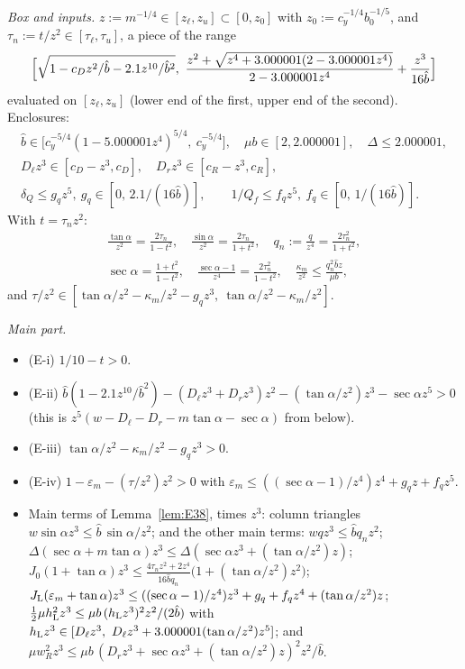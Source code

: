\documentclass[11pt]{amsart}
\newcommand{\sa}{\sin\alpha}
\newcommand{\ta}{\tan\alpha}
\newcommand{\se}{\sec\alpha}
\theoremstyle{definition}
\theoremstyle{remark}
\numberwithin{equation}{section}
\begin{document}
\emph{Box and inputs.} $z:=m^{-1/4}\in[z_\ell,z_u]\subset[0,z_0]$ with $z_0:=c_y^{-1/4}b_0^{-1/5}$, and
$\tau_n:=t/z^2\in[\tau_\ell,\tau_u]$, a piece of the range
\[
\Bigl[\sqrt{1-c_Dz^2/\hat b-2.1z^{10}/\hat b^2},\ \frac{z^2+\sqrt{z^4+3.000001(2-3.000001z^4)}}{2-3.000001z^4}+\frac{z^3}{16\hat b}\Bigr]
\]
evaluated on $[z_\ell,z_u]$ (lower end of the first, upper end of the second). Enclosures:
\begin{gather*}
\hat b\in\bigl[c_y^{-5/4}(1-5.000001z^4)^{5/4},\ c_y^{-5/4}\bigr],\quad \mu b\in[2,2.000001],\quad \Delta\le2.000001,\\
D_\ell z^3\in[c_D-z^3,c_D],\quad D_rz^3\in[c_R-z^3,c_R],\\
\delta_Q\le g_qz^5,\ g_q\in[0,\,2.1/(16\hat b)],\qquad
1/Q_f\le f_qz^5,\ f_q\in[0,\,1/(16\hat b)].
\end{gather*}
With $t=\tau_nz^2$:
\begin{gather*}
\frac{\ta}{z^2}=\frac{2\tau_n}{1-t^2},\quad \frac{\sa}{z^2}=\frac{2\tau_n}{1+t^2},\quad q_n:=\frac q{z^4}=\frac{2\tau_n^2}{1+t^2},\\
\se=\frac{1+t^2}{1-t^2},\quad \frac{\se-1}{z^4}=\frac{2\tau_n^2}{1-t^2},\quad
\frac{\kappa_m}{z^2}\le\frac{q_n^2\hat bz}{\mu b},
\end{gather*}
and $\tau/z^2\in[\ta/z^2-\kappa_m/z^2-g_qz^3,\ \ta/z^2-\kappa_m/z^2]$.

\emph{Main part.}
\begin{itemize}
\item (E-i) $1/10-t>0$.
\item (E-ii) $\hat b(1-2.1z^{10}/\hat b^2)-(D_\ell z^3+D_rz^3)z^2-(\ta/z^2)z^3-\se z^5>0$ (this is
$z^5(w-D_\ell-D_r-m\ta-\se)$ from below).
\item (E-iii) $\ta/z^2-\kappa_m/z^2-g_qz^3>0$.
\item (E-iv) $1-\varepsilon_m-(\tau/z^2)z^2>0$ with $\varepsilon_m\le((\se-1)/z^4)z^4+g_qz+f_qz^5$.
\item Main terms of Lemma~\ref{lem:E38}, times $z^3$: column triangles $w\sa z^3\le\hat b\,\sa/z^2$; and the other main
terms: $wqz^3\le\hat bq_nz^2$; $\Delta(\se+m\ta)z^3\le\Delta(\se z^3+(\ta/z^2)z)$;
$J_0(1+\ta)z^3\le\frac{4\tau_nz^2+2z^4}{16\hat bq_n}\bigl(1+(\ta/z^2)z^2\bigr)$;
$J_{\rm L}(\varepsilon_m+\ta)z^3\le((\se-1)/z^4)z^3+g_q+f_qz^4+(\ta/z^2)z$;
$\frac12\mu h_{\rm L}^2z^3\le\mu b\,(h_{\rm L}z^3)^2z^2/(2\hat b)$ with
$h_{\rm L}z^3\in[D_\ell z^3,\ D_\ell z^3+3.000001(\ta/z^2)z^5]$; and
$\mu w_R^2z^3\le\mu b\,(D_rz^3+\se z^3+(\ta/z^2)z)^2z^2/\hat b$.
\end{itemize}
\end{document}
